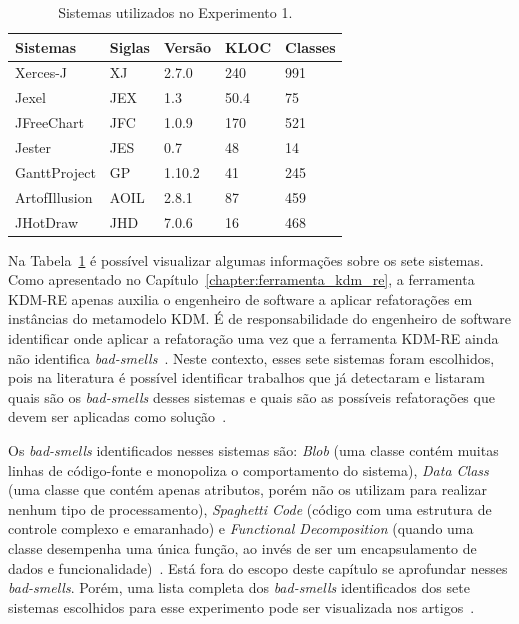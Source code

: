 \begin{table}[h]
\centering
\caption{Sistemas utilizados no Experimento 1.}
\label{tab:sistemas_experimentos}
\begin{tabular}{ | m{2cm} | m{1cm}| m{1cm}| m{1cm} | m{1cm} | } 
\hline
Sistemas & Siglas & Versão & KLOC & Classes \\ 
\hline
Xerces-J & XJ & 2.7.0 & 240 & 991\\ 
\hline
Jexel & JEX & 1.3 & 50.4 & 75\\
\hline
JFreeChart & JFC & 1.0.9 & 170 & 521\\ 
\hline
Jester & JES & 0.7 & 48 & 14\\ 
\hline
GanttProject & GP & 1.10.2 & 41 & 245\\ 
\hline
ArtofIllusion & AOIL &  2.8.1 & 87 & 459\\ 
\hline
JHotDraw & JHD & 7.0.6 & 16 & 468 \\ 
\hline
\end{tabular}
\end{table}

Na Tabela~\ref{tab:sistemas_experimentos} é possível visualizar algumas informações sobre os sete sistemas. Como apresentado no Capítulo~\ref{chapter:ferramenta_kdm_re}, a ferramenta KDM-RE apenas auxilia o engenheiro de software a aplicar refatorações em instâncias do metamodelo KDM. É de responsabilidade do engenheiro de software identificar onde aplicar a refatoração uma vez que a ferramenta KDM-RE ainda não identifica \textit{bad-smells}~\cite{Fowler1999}. Neste contexto, esses sete sistemas foram escolhidos, pois na literatura é possível identificar trabalhos que já detectaram e listaram quais são os \textit{bad-smells} desses sistemas e quais são as possíveis refatorações que devem ser aplicadas como solução~\cite{Kessentini_2011, Ouni_2013, Moha_2010, Kessentini_2010}. %



Os \textit{bad-smells} identificados nesses sistemas são: \textit{Blob} (uma classe contém muitas linhas de código-fonte e monopoliza o comportamento do sistema), \textit{Data Class} (uma classe que contém apenas atributos, porém não os utilizam para realizar nenhum tipo de processamento), \textit{Spaghetti Code} (código com uma estrutura de controle complexo e emaranhado) e \textit{Functional Decomposition} (quando uma classe desempenha uma única função, ao invés de ser um encapsulamento de dados e funcionalidade)~\cite{Fowler1999}. Está fora do escopo deste capítulo se aprofundar nesses \textit{bad-smells}. Porém, uma lista completa dos \textit{bad-smells} identificados dos sete sistemas escolhidos para esse experimento pode ser visualizada nos artigos~\cite{Kessentini_2011, Ouni_2013, Moha_2010, Kessentini_2010}.


